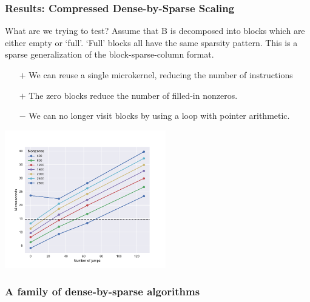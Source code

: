 \documentclass[9pt]{beamer}
\begin{document}
\begin{frame}[fragile]
  \frametitle{Results: Compressed Dense-by-Sparse Scaling}

  What are we trying to test? 
  Assume that B is decomposed into blocks which are either empty or `full'. `Full' blocks all have the same sparsity pattern. This is a sparse generalization of the block-sparse-column format.

  \begin{itemize}
  \item[$+$] We can reuse a single microkernel, reducing the number of instructions
  \item[$+$] The zero blocks reduce the number of filled-in nonzeros.
  \item[$-$] We can no longer visit blocks by using a loop with pointer arithmetic.
  \end{itemize}

  \centering
  \includegraphics[height=6cm]{images/jump_penalty_new.pdf}

\end{frame}


\begin{frame}
  \frametitle{A family of dense-by-sparse algorithms}
  
\end{frame}
\end{document}
